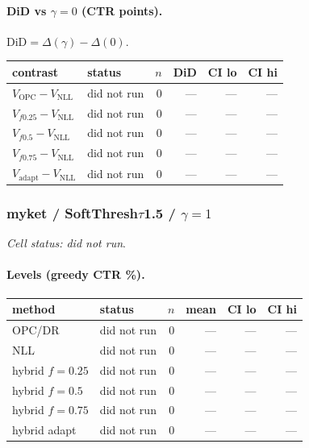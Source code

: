 \documentclass[10pt,a4paper]{article}
\begin{document}
\paragraph{DiD vs $\gamma=0$ (CTR points).} $\mathrm{DiD}=\Delta(\gamma)-\Delta(0)$.
{\centering\small\begin{tabular}{llrrrr}
\toprule contrast & status & $n$ & DiD & CI lo & CI hi \\
\midrule
$V_{\mathrm{OPC}}-V_{\mathrm{NLL}}$ & did not run & 0 & --- & --- & --- \\
$V_{f0.25}-V_{\mathrm{NLL}}$ & did not run & 0 & --- & --- & --- \\
$V_{f0.5}-V_{\mathrm{NLL}}$ & did not run & 0 & --- & --- & --- \\
$V_{f0.75}-V_{\mathrm{NLL}}$ & did not run & 0 & --- & --- & --- \\
$V_{\mathrm{adapt}}-V_{\mathrm{NLL}}$ & did not run & 0 & --- & --- & --- \\
\bottomrule\end{tabular}\par}
\bigskip
\subsubsection{myket / SoftThresh$\tau$1.5 / $\gamma=1$}
\emph{Cell status: did not run}.
\paragraph{Levels (greedy CTR \%).}
{\centering\small\begin{tabular}{llrrrr}
\toprule method & status & $n$ & mean & CI lo & CI hi \\
\midrule
OPC/DR & did not run & 0 & --- & --- & --- \\
NLL & did not run & 0 & --- & --- & --- \\
hybrid $f{=}0.25$ & did not run & 0 & --- & --- & --- \\
hybrid $f{=}0.5$ & did not run & 0 & --- & --- & --- \\
hybrid $f{=}0.75$ & did not run & 0 & --- & --- & --- \\
hybrid adapt & did not run & 0 & --- & --- & --- \\
\bottomrule\end{tabular}\par}
\end{document}

